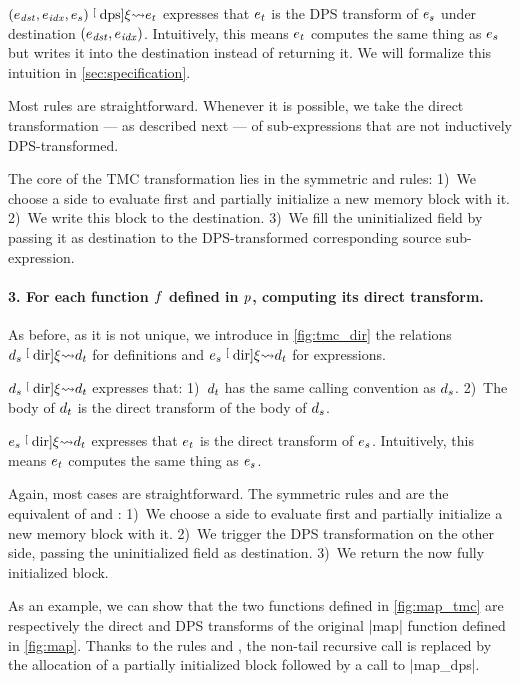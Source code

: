 $(\datalangExpr_\mathit{dst}, \datalangExpr_\mathit{idx}, \datalangExpr_s) \tmcDps{\datalangRenaming} \datalangExpr_t$ expresses that $\datalangExpr_t$ is the DPS transform of $\datalangExpr_s$ under destination $(\datalangExpr_\mathit{dst}, \datalangExpr_\mathit{idx})$.
Intuitively, this means $\datalangExpr_t$ computes the same thing as $\datalangExpr_s$ but writes it into the destination instead of returning it.
We will formalize this intuition in \cref{sec:specification}.

Most rules are straightforward.
Whenever it is possible, we take the direct transformation --- as described next --- of sub-expressions that are not inductively DPS-transformed.

The core of the TMC transformation lies in the symmetric  and  rules:
1)~We choose a side to evaluate first and partially initialize a new memory block with it.
2)~We write this block to the destination.
3)~We fill the uninitialized field by passing it as destination to the DPS-transformed corresponding source sub-expression.

\paragraph{3. For each function $\datalangFn$ defined in $\datalangProg$, computing its direct transform.}
As before, as it is not unique, we introduce in \cref{fig:tmc_dir} the relations $\datalangDef_s \tmcDir{\datalangRenaming} \datalangDef_t$ for definitions and $\datalangExpr_s \tmcDir{\datalangRenaming} \datalangDef_t$ for expressions.

$\datalangDef_s \tmcDir{\datalangRenaming} \datalangDef_t$ expresses that:
1)~$\datalangDef_t$ has the same calling convention as $\datalangDef_s$.
2)~The body of $\datalangDef_t$ is the direct transform of the body of $\datalangDef_s$.

$\datalangExpr_s \tmcDir{\datalangRenaming} \datalangDef_t$ expresses that $\datalangExpr_t$ is the direct transform of $\datalangExpr_s$.
Intuitively, this means $\datalangExpr_t$ computes the same thing as $\datalangExpr_s$.

Again, most cases are straightforward.
The symmetric rules  and  are the equivalent of  and :
1)~We choose a side to evaluate first and partially initialize a new memory block with it.
2)~We trigger the DPS transformation on the other side, passing the uninitialized field as destination.
3)~We return the now fully initialized block.

\medskip

As an example, we can show that the two \DataLang functions defined in \cref{fig:map_tmc} are respectively the direct and DPS transforms of the original \datalang|map| function defined in \cref{fig:map}.
Thanks to the rules  and , the non-tail recursive call is replaced by the allocation of a partially initialized block followed by a call to \datalang|map_dps|.




